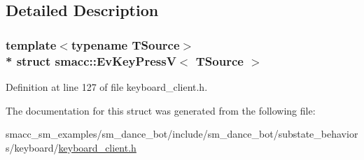 \subsection{Detailed Description}
\subsubsection*{template$<$typename T\+Source$>$\\*
struct smacc\+::\+Ev\+Key\+Press\+V$<$ T\+Source $>$}



Definition at line 127 of file keyboard\+\_\+client.\+h.



The documentation for this struct was generated from the following file\+:\begin{DoxyCompactItemize}
\item 
smacc\+\_\+sm\+\_\+examples/sm\+\_\+dance\+\_\+bot/include/sm\+\_\+dance\+\_\+bot/substate\+\_\+behaviors/keyboard/\hyperlink{keyboard__client_8h}{keyboard\+\_\+client.\+h}\end{DoxyCompactItemize}
